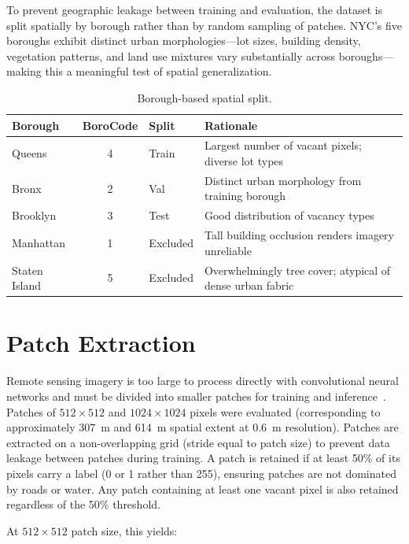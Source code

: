 To prevent geographic leakage between training and evaluation, the dataset is split spatially by borough rather than by random sampling of patches. NYC's five boroughs exhibit distinct urban morphologies---lot sizes, building density, vegetation patterns, and land use mixtures vary substantially across boroughs---making this a meaningful test of spatial generalization.

\begin{table}[htbp]
  \centering
  \caption{Borough-based spatial split.}
  \label{tab:borough_split}
  \begin{tabular}{lcll}
    \toprule
    \textbf{Borough} & \textbf{BoroCode} & \textbf{Split} & \textbf{Rationale} \\
    \midrule
    Queens         & 4 & Train    & Largest number of vacant pixels; diverse lot types \\
    Bronx          & 2 & Val      & Distinct urban morphology from training borough \\
    Brooklyn       & 3 & Test     & Good distribution of vacancy types \\
    Manhattan      & 1 & Excluded & Tall building occlusion renders imagery unreliable \\
    Staten Island  & 5 & Excluded & Overwhelmingly tree cover; atypical of dense urban fabric \\
    \bottomrule
  \end{tabular}
\end{table}

\section{Patch Extraction}
\label{sec:patch_extraction}

Remote sensing imagery is too large to process directly with convolutional neural networks and must be divided into smaller patches for training and inference~\cite{huang2019Tiling}. Patches of $512\times512$ and $1024\times1024$ pixels were evaluated (corresponding to approximately 307~m and 614~m spatial extent at 0.6~m resolution). Patches are extracted on a non-overlapping grid (stride equal to patch size) to prevent data leakage between patches during training. A patch is retained if at least 50\% of its pixels carry a label (0 or 1 rather than 255), ensuring patches are not dominated by roads or water. Any patch containing at least one vacant pixel is also retained regardless of the 50\% threshold.

At $512\times512$ patch size, this yields:

